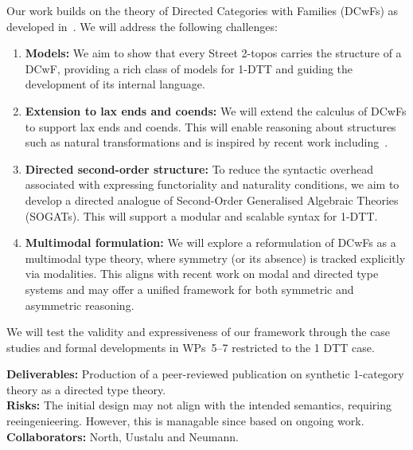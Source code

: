 \documentclass[a4paper,11pt]{article}
\begin{document}
Our work builds on the theory of Directed Categories with Families
(DCwFs) as developed in~\cite{altenkirch_neumann_2024}. We will address the
following challenges: 

\begin{enumerate}
\item \textbf{Models:} We aim to show that every Street 2-topos carries the structure of a DCwF, providing a rich class of models for 1-DTT and guiding the development of its internal language.

\item \textbf{Extension to lax ends and coends:} We will extend the
  calculus of DCwFs to support lax ends and coends. This will enable
  reasoning about structures such as natural transformations and is
  inspired by recent work including~\cite{north_2019}.  

\item \textbf{Directed second-order structure:} To reduce the
  syntactic overhead associated with expressing functoriality and
  naturality conditions, we aim to develop a directed analogue of
  Second-Order Generalised Algebraic Theories (SOGATs). This will support a modular
  and scalable syntax for 1-DTT. 

\item \textbf{Multimodal formulation:} We will explore a reformulation
  of DCwFs as a multimodal type theory, where symmetry (or its
  absence) is tracked explicitly via modalities. This aligns with
  recent work on modal and directed type systems and may offer a
  unified framework for both symmetric and asymmetric reasoning.
\end{enumerate}

We will test the validity and expressiveness of our 
framework through the case studies and formal developments in
WPs~5--7 restricted to the 1 DTT case.

\textbf{Deliverables:} Production of a peer-reviewed publication on synthetic 1-category
theory as a directed type theory. \\
\textbf{Risks:}
The initial design may not align with the intended semantics,
requiring reeingenieering. However, this is managable since based on
ongoing work.\\
\textbf{Collaborators:}
North, Uustalu and Neumann.

  
\end{document}
